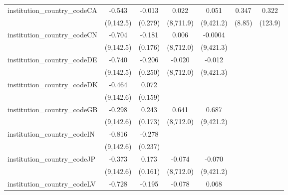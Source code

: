 \begin{tabular}{lcccccc}
   institution\_country\_codeCA          & -0.543        & -0.013         & 0.022         & 0.051         & 0.347          & 0.322\\   
                                         & (9,142.5)     & (0.279)        & (8,711.9)     & (9,421.2)     & (8.85)         & (123.9)\\   
   institution\_country\_codeCN          & -0.704        & -0.181         & 0.006         & -0.0004       &                &   \\   
                                         & (9,142.5)     & (0.176)        & (8,712.0)     & (9,421.3)     &                &   \\   
   institution\_country\_codeDE          & -0.740        & -0.206         & -0.020        & -0.012        &                &   \\   
                                         & (9,142.5)     & (0.250)        & (8,712.0)     & (9,421.3)     &                &   \\   
   institution\_country\_codeDK          & -0.464        & 0.072          &               &               &                &   \\   
                                         & (9,142.6)     & (0.159)        &               &               &                &   \\   
   institution\_country\_codeGB          & -0.298        & 0.243          & 0.641         & 0.687         &                &   \\   
                                         & (9,142.6)     & (0.173)        & (8,712.0)     & (9,421.2)     &                &   \\   
   institution\_country\_codeIN          & -0.816        & -0.278         &               &               &                &   \\   
                                         & (9,142.6)     & (0.237)        &               &               &                &   \\   
   institution\_country\_codeJP          & -0.373        & 0.173          & -0.074        & -0.070        &                &   \\   
                                         & (9,142.6)     & (0.161)        & (8,712.0)     & (9,421.2)     &                &   \\   
   institution\_country\_codeLV          & -0.728        & -0.195         & -0.078        & 0.068         &                &   \\   

\end{tabular}
